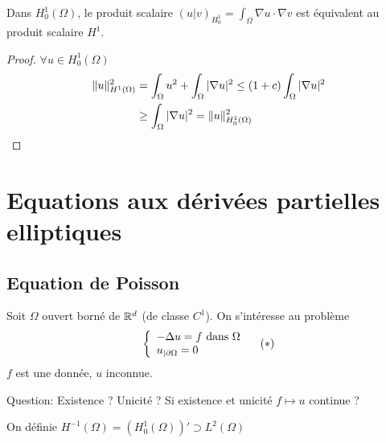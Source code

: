 \documentclass[]{report}
\begin{document}
    \begin{cor}{}{}
        Dans $H_0^1(\Omega)$, le produit scalaire $(u|v)_{H_0^1}=\int_\Omega \nabla u\cdot \nabla v$ est équivalent au produit scalaire $H^1$.
    \end{cor}

    \begin{proof}
        $\forall u\in H_0^1(\Omega)$
        \begin{align*}
            \lVert u \rVert^2_{H^1(\Omega)}&=\int_\Omega u^2+\int_\Omega |\nabla u|^2\le (1+c)\int_\Omega |\nabla u|^2\\
            &\ge \int_\Omega |\nabla u|^2=\lVert u \rVert^2_{H_0^1(\Omega)}
        \end{align*}
    \end{proof}

    \chapter{Equations aux dérivées partielles elliptiques}

    \section{Equation de Poisson}

    Soit $\Omega$ ouvert borné de $\mathbb{R}^d$ (de classe $C^1$). On s'intéresse au problème
    \[\left\{\begin{array}{ll} -\Delta u=f\text{ dans $\Omega$}\\u_{|\partial\Omega}=0 \end{array} \right.\quad(*)\]
    $f$ est une donnée, $u$ inconnue.
    \begin{center}
        Question: Existence ? Unicité ? Si existence et unicité $f\mapsto u$ continue ?\\
    \end{center}

    \begin{df}{}{}
        On définie $H^{-1}(\Omega)=\left(H_0^1(\Omega)\right)'\supset L^2(\Omega)$
    \end{df}
\end{document}
